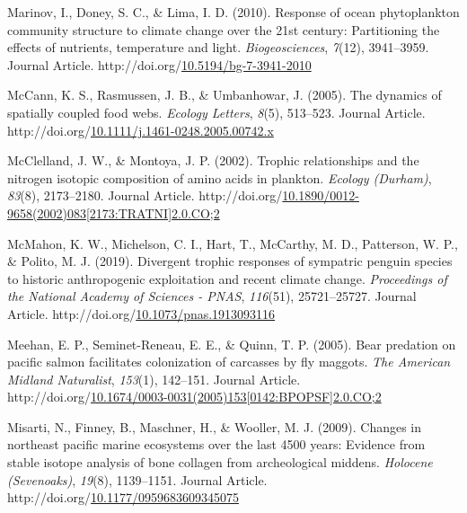 \documentclass [11pt, proquest] {uwthesis}[2015/03/03]
\newlength{\cslhangindent}
\newenvironment{CSLReferences}%
{\setlength{\parindent}{0pt}%
\everypar{\setlength{\hangindent}{\cslhangindent}}\ignorespaces}%
{\par}
\begin{document}
\begin{CSLReferences}{1}{0}
\leavevmode\hypertarget{ref-Marinov2010}{}%
Marinov, I., Doney, S. C., \& Lima, I. D. (2010). Response of ocean phytoplankton community structure to climate change over the 21st century: Partitioning the effects of nutrients, temperature and light. \emph{Biogeosciences}, \emph{7}(12), 3941--3959. Journal Article. http://doi.org/\href{https://doi.org/10.5194/bg-7-3941-2010}{10.5194/bg-7-3941-2010}

\leavevmode\hypertarget{ref-McCann2005}{}%
McCann, K. S., Rasmussen, J. B., \& Umbanhowar, J. (2005). The dynamics of spatially coupled food webs. \emph{Ecology Letters}, \emph{8}(5), 513--523. Journal Article. http://doi.org/\href{https://doi.org/10.1111/j.1461-0248.2005.00742.x}{10.1111/j.1461-0248.2005.00742.x}

\leavevmode\hypertarget{ref-McClelland2002}{}%
McClelland, J. W., \& Montoya, J. P. (2002). Trophic relationships and the nitrogen isotopic composition of amino acids in plankton. \emph{Ecology (Durham)}, \emph{83}(8), 2173--2180. Journal Article. http://doi.org/\href{https://doi.org/10.1890/0012-9658(2002)083\%5B2173:TRATNI\%5D2.0.CO;2}{10.1890/0012-9658(2002)083{[}2173:TRATNI{]}2.0.CO;2}

\leavevmode\hypertarget{ref-McMahon2019}{}%
McMahon, K. W., Michelson, C. I., Hart, T., McCarthy, M. D., Patterson, W. P., \& Polito, M. J. (2019). Divergent trophic responses of sympatric penguin species to historic anthropogenic exploitation and recent climate change. \emph{Proceedings of the National Academy of Sciences - PNAS}, \emph{116}(51), 25721--25727. Journal Article. http://doi.org/\href{https://doi.org/10.1073/pnas.1913093116}{10.1073/pnas.1913093116}

\leavevmode\hypertarget{ref-Meehan2005}{}%
Meehan, E. P., Seminet-Reneau, E. E., \& Quinn, T. P. (2005). Bear predation on pacific salmon facilitates colonization of carcasses by fly maggots. \emph{The American Midland Naturalist}, \emph{153}(1), 142--151. Journal Article. http://doi.org/\href{https://doi.org/10.1674/0003-0031(2005)153\%5B0142:BPOPSF\%5D2.0.CO;2}{10.1674/0003-0031(2005)153{[}0142:BPOPSF{]}2.0.CO;2}

\leavevmode\hypertarget{ref-Misarti2009}{}%
Misarti, N., Finney, B., Maschner, H., \& Wooller, M. J. (2009). Changes in northeast pacific marine ecosystems over the last 4500 years: Evidence from stable isotope analysis of bone collagen from archeological middens. \emph{Holocene (Sevenoaks)}, \emph{19}(8), 1139--1151. Journal Article. http://doi.org/\href{https://doi.org/10.1177/0959683609345075}{10.1177/0959683609345075}


\end{CSLReferences}
\end{document}
